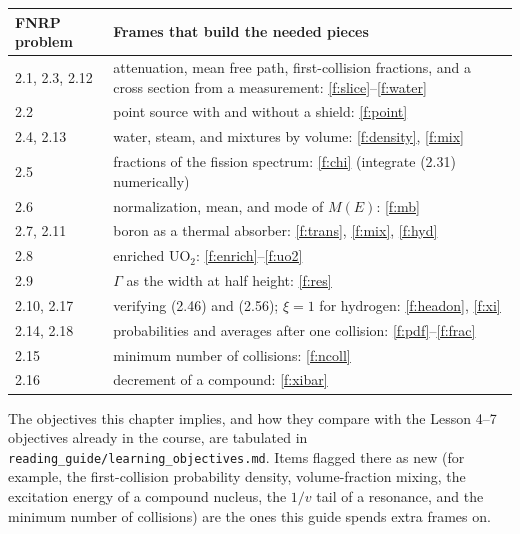 \documentclass[compact]{ne630handout}
\begin{document}
\begin{handoutsmall}[8.3]
\begin{tabularx}{\linewidth}{@{}p{0.95in}Y@{}}
\toprule
FNRP problem & Frames that build the needed pieces\\
, 2.3, 2.12 & attenuation, mean free path, first-collision fractions, and a cross section from a measurement: \ref*{f:slice}--\ref*{f:water}\\
2.2 & point source with and without a shield: \ref*{f:point}\\
2.4, 2.13 & water, steam, and mixtures by volume: \ref*{f:density}, \ref*{f:mix}\\
2.5 & fractions of the fission spectrum: \ref*{f:chi} (integrate (2.31) numerically)\\
2.6 & normalization, mean, and mode of $M(E)$: \ref*{f:mb}\\
2.7, 2.11 & boron as a thermal absorber: \ref*{f:trans}, \ref*{f:mix}, \ref*{f:hyd}\\
2.8 & enriched $\mathrm{UO_2}$: \ref*{f:enrich}--\ref*{f:uo2}\\
2.9 & $\Gamma$ as the width at half height: \ref*{f:res}\\
2.10, 2.17 & verifying (2.46) and (2.56); $\xi=1$ for hydrogen: \ref*{f:headon}, \ref*{f:xi}\\
2.14, 2.18 & probabilities and averages after one collision: \ref*{f:pdf}--\ref*{f:frac}\\
2.15 & minimum number of collisions: \ref*{f:ncoll}\\
2.16 & decrement of a compound: \ref*{f:xibar}\\
\bottomrule
\end{tabularx}
\end{handoutsmall}

\begin{takeawaybox}
The objectives this chapter implies, and how they compare with the Lesson 4--7 objectives already in the course, are tabulated in \texttt{reading\_guide/learning\_objectives.md}. Items flagged there as new (for example, the first-collision probability density, volume-fraction mixing, the excitation energy of a compound nucleus, the $1/v$ tail of a resonance, and the minimum number of collisions) are the ones this guide spends extra frames on.
\end{takeawaybox}
\end{document}
